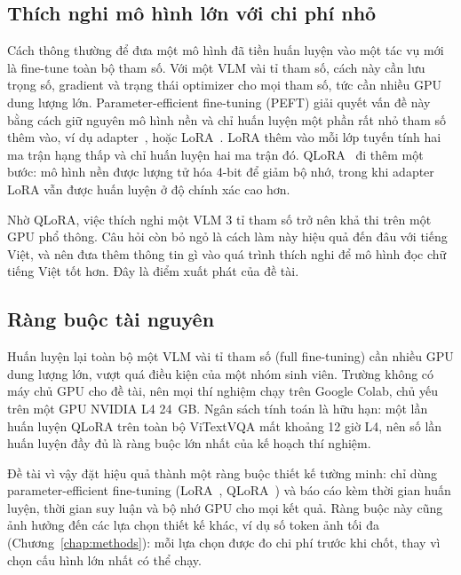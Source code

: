\subsection{Thích nghi mô hình lớn với chi phí nhỏ}

Cách thông thường để đưa một mô hình đã tiền huấn luyện vào một tác vụ mới là
fine-tune toàn bộ tham số. Với một VLM vài tỉ tham số, cách này cần lưu trọng số,
gradient và trạng thái optimizer cho mọi tham số, tức cần nhiều GPU dung lượng
lớn. Parameter-efficient fine-tuning (PEFT) giải quyết vấn đề này bằng cách giữ
nguyên mô hình nền và chỉ huấn luyện một phần rất nhỏ tham số thêm vào, ví dụ
adapter~\cite{houlsby2019adapter}, \cite{sung2022vladapter} hoặc LoRA~\cite{hu2022lora}.
LoRA thêm vào mỗi lớp tuyến tính hai ma trận hạng thấp và chỉ huấn luyện hai ma
trận đó. QLoRA~\cite{dettmers2023qlora} đi thêm một bước: mô hình nền được lượng
tử hóa 4-bit để giảm bộ nhớ, trong khi adapter LoRA vẫn được huấn luyện ở độ
chính xác cao hơn.

Nhờ QLoRA, việc thích nghi một VLM 3 tỉ tham số trở nên khả thi trên một GPU phổ
thông. Câu hỏi còn bỏ ngỏ là cách làm này hiệu quả đến đâu với tiếng Việt, và
nên đưa thêm thông tin gì vào quá trình thích nghi để mô hình đọc chữ tiếng Việt
tốt hơn. Đây là điểm xuất phát của đề tài.

\subsection{Ràng buộc tài nguyên}

Huấn luyện lại toàn bộ một VLM vài tỉ tham số (full fine-tuning) cần nhiều GPU
dung lượng lớn, vượt quá điều kiện của một nhóm sinh viên. Trường không có máy
chủ GPU cho đề tài, nên mọi thí nghiệm chạy trên Google Colab, chủ yếu trên một
GPU NVIDIA L4 24~GB. Ngân sách tính toán là hữu hạn: một lần huấn luyện QLoRA
trên toàn bộ ViTextVQA mất khoảng 12 giờ L4, nên số lần huấn luyện đầy đủ là ràng
buộc lớn nhất của kế hoạch thí nghiệm.

Đề tài vì vậy đặt hiệu quả thành một ràng buộc thiết kế tường minh: chỉ dùng
parameter-efficient fine-tuning (LoRA~\cite{hu2022lora},
QLoRA~\cite{dettmers2023qlora}) và báo cáo kèm thời gian huấn luyện, thời gian suy
luận và bộ nhớ GPU cho mọi kết quả. Ràng buộc này cũng ảnh hưởng đến các lựa chọn
thiết kế khác, ví dụ số token ảnh tối đa (Chương~\ref{chap:methods}): mỗi lựa
chọn được đo chi phí trước khi chốt, thay vì chọn cấu hình lớn nhất có thể chạy.

